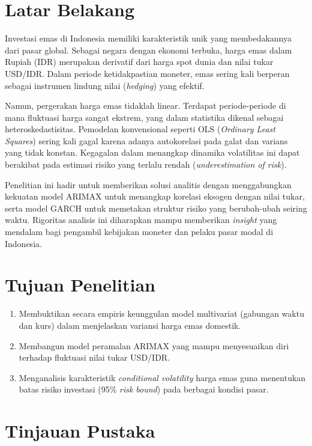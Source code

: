 \documentclass[12pt, a4paper]{article}
\begin{document}
\newpage
\tableofcontents
\newpage

\section{Latar Belakang}
Investasi emas di Indonesia memiliki karakteristik unik yang membedakannya dari pasar global. Sebagai negara dengan ekonomi terbuka, harga emas dalam Rupiah (IDR) merupakan derivatif dari harga spot dunia dan nilai tukar USD/IDR. Dalam periode ketidakpastian moneter, emas sering kali berperan sebagai instrumen lindung nilai (\textit{hedging}) yang efektif.

Namun, pergerakan harga emas tidaklah linear. Terdapat periode-periode di mana fluktuasi harga sangat ekstrem, yang dalam statistika dikenal sebagai heteroskedastisitas. Pemodelan konvensional seperti OLS (\textit{Ordinary Least Squares}) sering kali gagal karena adanya autokorelasi pada galat dan varians yang tidak konstan. Kegagalan dalam menangkap dinamika volatilitas ini dapat berakibat pada estimasi risiko yang terlalu rendah (\textit{underestimation of risk}).

Penelitian ini hadir untuk memberikan solusi analitis dengan menggabungkan kekuatan model ARIMAX untuk menangkap korelasi eksogen dengan nilai tukar, serta model GARCH untuk memetakan struktur risiko yang berubah-ubah seiring waktu. Rigoritas analisis ini diharapkan mampu memberikan \textit{insight} yang mendalam bagi pengambil kebijakan moneter dan pelaku pasar modal di Indonesia.

\section{Tujuan Penelitian}
\begin{enumerate}[label=\arabic*.]
    \item Membuktikan secara empiris keunggulan model multivariat (gabungan waktu dan kurs) dalam menjelaskan variansi harga emas domestik.
    \item Membangun model peramalan ARIMAX yang mampu menyesuaikan diri terhadap fluktuasi nilai tukar USD/IDR.
    \item Menganalisis karakteristik \textit{conditional volatility} harga emas guna menentukan batas risiko investasi (95\% \textit{risk bound}) pada berbagai kondisi pasar.
\end{enumerate}

\section{Tinjauan Pustaka}
\end{document}
